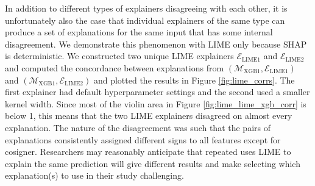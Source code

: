 \documentclass[mnsc,blindrev]{informs3}
\begin{document}
In addition to different types of explainers disagreeing with each other, it is unfortunately also the case that individual explainers of the same type can produce a set of explanations for the same input that has some internal disagreement. We demonstrate this phenomenon with LIME only because SHAP is deterministic. %
           We constructed two unique LIME explainers $\mathcal{E}_{\text{LIME1}}$ and $\mathcal{E}_{\text{LIME2}}$ and computed the concordance between explanations from $(\mathcal{M}_{\text{XGB1}}, \mathcal{E}_{\text{LIME1}})$ and $(\mathcal{M}_{\text{XGB1}}, \mathcal{E}_{\text{LIME2}})$ and plotted the results in Figure \ref{fig:lime_corrs}. The first explainer had default hyperparameter settings and the second used a smaller kernel width. Since most of the violin area in Figure \ref{fig:lime_lime_xgb_corr} is below 1, this means that the two LIME explainers disagreed on almost every explanation. The nature of the disagreement was such that the pairs of explanations consistently assigned different signs to all features except for cosigner. Researchers may reasonably anticipate that repeated uses LIME to explain the same prediction will give different results and make selecting which explanation(s) to use in their study challenging. 
\end{document}
